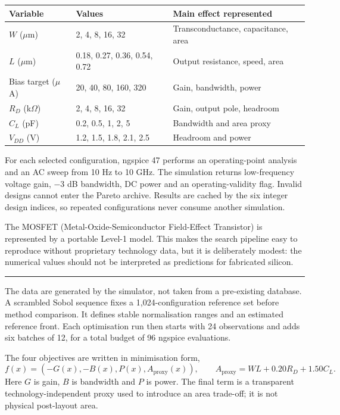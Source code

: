 \documentclass[10pt,a4paper]{article}
\newcommand{\rsection}[1]{\vspace{4pt}{\large\bfseries\textcolor{accent}{#1}}\par\vspace{-2pt}\textcolor{muted}{\rule{\textwidth}{0.5pt}}}
\begin{document}
\begin{center}\small
\begin{tabular}{lll}\toprule
Variable & Values & Main effect represented \\\midrule
$W$ ($\mu$m) & 2, 4, 8, 16, 32 & Transconductance, capacitance, area \\
$L$ ($\mu$m) & 0.18, 0.27, 0.36, 0.54, 0.72 & Output resistance, speed, area \\
Bias target ($\mu$A) & 20, 40, 80, 160, 320 & Gain, bandwidth, power \\
$R_D$ (k$\Omega$) & 2, 4, 8, 16, 32 & Gain, output pole, headroom \\
$C_L$ (pF) & 0.2, 0.5, 1, 2, 5 & Bandwidth and area proxy \\
$V_{DD}$ (V) & 1.2, 1.5, 1.8, 2.1, 2.5 & Headroom and power \\\bottomrule
\end{tabular}\end{center}

For each selected configuration, ngspice 47 performs an operating-point analysis and an AC sweep from 10 Hz to 10 GHz. The simulation returns low-frequency voltage gain, $-3$ dB bandwidth, DC power and an operating-validity flag. Invalid designs cannot enter the Pareto archive. Results are cached by the six integer design indices, so repeated configurations never consume another simulation.

The MOSFET (Metal-Oxide-Semiconductor Field-Effect Transistor) is represented by a portable Level-1 model. This makes the search pipeline easy to reproduce without proprietary technology data, but it is deliberately modest: the numerical values should not be interpreted as predictions for fabricated silicon.

\rsection{Data and objective space}

The data are generated by the simulator, not taken from a pre-existing database. A scrambled Sobol sequence fixes a 1,024-configuration reference set before method comparison. It defines stable normalisation ranges and an estimated reference front. Each optimisation run then starts with 24 observations and adds six batches of 12, for a total budget of 96 ngspice evaluations.

The four objectives are written in minimisation form,
\[
f(x)=(-G(x),-B(x),P(x),A_{\mathrm{proxy}}(x)),\qquad
A_{\mathrm{proxy}}=WL+0.20R_D+1.50C_L.
\]
Here $G$ is gain, $B$ is bandwidth and $P$ is power. The final term is a transparent technology-independent proxy used to introduce an area trade-off; it is not physical post-layout area.
\end{document}
